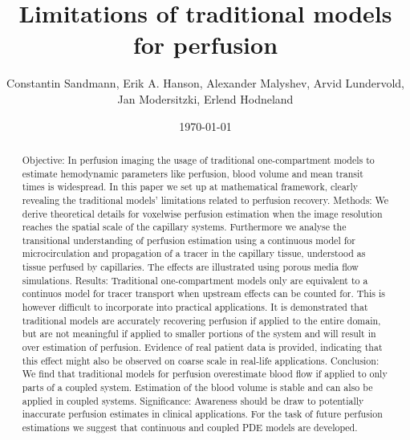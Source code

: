 \documentclass[journal,twocolumn]{IEEEtran}
\title{Limitations of traditional models for perfusion}
\author{Constantin Sandmann, Erik A. Hanson, Alexander Malyshev,  Arvid Lundervold, Jan Modersitzki, Erlend Hodneland }
\date{\today}
\begin{document}
	\maketitle

	\begin{abstract}
		Objective:
		In perfusion imaging the usage of traditional one-compartment models to estimate hemodynamic parameters like perfusion, blood volume and mean transit times is widespread. In this paper we set up at mathematical framework, clearly revealing the traditional models' limitations related to perfusion recovery.
		Methods:
		We derive theoretical details for voxelwise perfusion estimation when the image resolution reaches the spatial scale of the capillary systems. Furthermore we analyse the transitional understanding of perfusion estimation using a continuous model for microcirculation and propagation of a tracer in the capillary tissue, understood as tissue perfused by capillaries. The effects are illustrated using porous media flow simulations.
		Results:
		Traditional one-compartment models only are equivalent to a continuos model for tracer transport when upstream effects can be counted for. This is however difficult to incorporate into practical applications. 
		It is demonstrated that traditional models are accurately recovering perfusion if applied to the entire domain, but are not meaningful if applied to smaller portions of the system and will result in over estimation of perfusion. Evidence of real patient data is provided, indicating that this effect might also be observed on coarse scale in real-life applications.
		Conclusion:
		We find that traditional models for perfusion overestimate blood flow if applied to only parts of a coupled system. Estimation of the blood volume is stable and can also be applied in coupled systems.
		Significance:
		Awareness should be draw to potentially inaccurate perfusion estimates in clinical applications. For the task of future perfusion estimations we suggest that continuous and coupled PDE models are developed.		
	\end{abstract}

\end{document}
